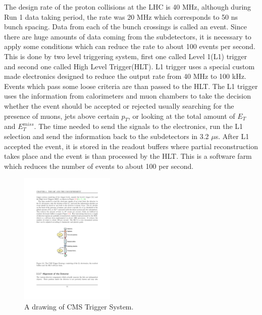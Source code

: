 The design rate of the proton collisions at the LHC is 40 MHz, although during Run 1 data taking period, the rate was 20 MHz which corresponds to 50 ns bunch spacing. Data from each of the bunch crossings is called an event. Since there are huge amounts of data coming from the subdetectors, it is necessary to apply some conditions which can reduce the rate to about 100 events per second. This is done by two level triggering system, first one called Level 1(L1) trigger and second one called High Level Trigger(HLT). L1 trigger uses a special custom made electronics designed to reduce the output rate from 40 MHz to 100 kHz. Events which pass some loose criteria are than passed to the HLT. The L1 trigger uses the information from calorimeters and muon chambers to take the decision whether the event should be accepted or rejected usually searching for the presence of muons, jets above certain $p_T$, or looking at the total amount of $E_T$ and $E_T^{miss}$. The time needed to send the signals to the electronics, run the L1 selection and send the information back to the subdetectors in 3.2 $\mu$s. After L1 accepted the event, it is stored in the readout buffers where partial reconstruction takes place and the event is than processed by the HLT. This is a software farm which reduces the number of events to about 100 per second. 
\begin{figure}[htbp]
	\centering
		\includegraphics[width=0.4\textwidth]{Figures/trigger.pdf}
	\caption[A drawing of CMS Trigger System.]{A drawing of CMS Trigger System. \cite{Chatrchyan:2008aa}}
	\label{fig:trig}
\end{figure}

